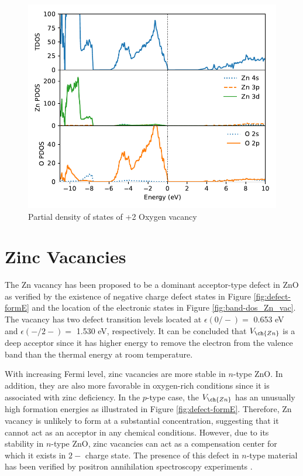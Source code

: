 \begin{figure}[tbh!]
	\centering
	\includegraphics[width=0.6\linewidth]{"images/rnd/dos-pdos_O_vac-p2"}
	\caption[Partial density of states of +2 Oxygen vacancy]{Partial density of states of +2 Oxygen vacancy}
	\label{fig:dos-pdos_O_vac-p2}
\end{figure}

\clearpage


\section{Zinc Vacancies}
The Zn vacancy has been proposed to be a dominant acceptor-type defect in ZnO as verified by the existence of negative charge defect states in Figure \ref{fig:defect-formE} and the location of the electronic states in Figure \ref{fig:band-dos_Zn_vac}. The  vacancy has two defect transition levels located at
$\epsilon(0/-)=$ 0.653 eV and  $\epsilon(-/2-)=$ 1.530 eV, respectively. It can be concluded that $V_{\ch{Zn}}$  is a deep acceptor since it has higher energy to remove the electron from the valence band than the thermal energy at room temperature.

With increasing Fermi level, zinc vacancies are more stable  in $n$-type ZnO. In addition, they are also more favorable in oxygen-rich conditions since it is associated with zinc deficiency. In the $p$-type case, the $V_{\ch{Zn}}$ has an unusually high formation energies as illustrated in Figure \ref{fig:defect-formE}. Therefore,  Zn vacancy is unlikely to form at a substantial concentration, suggesting that it cannot act as an acceptor in any chemical conditions. However, due to its stability in $n$-type ZnO, zinc vacancies can act as a compensation center for which it exists in $2-$ charge state. The presence of this defect in $n$-type material has been verified by positron annihilation spectroscopy experiments \citep{Tuomisto2003,Tuomisto2005}.

